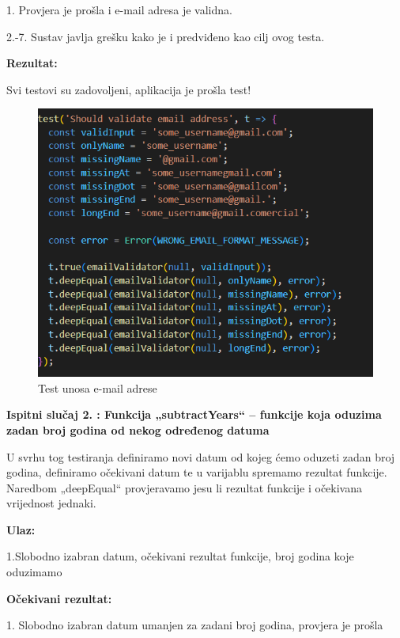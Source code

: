                 1. Provjera je prošla i e-mail adresa je validna.

                2.-7. Sustav javlja grešku kako je i predviđeno kao cilj ovog testa. 

                \textbf{Rezultat:} 

                Svi testovi su zadovoljeni, aplikacija je prošla test!

	\begin{figure}[H]
			\includegraphics[scale=0.5]{slike/EmailTest.PNG} %
			\centering
			\caption{Test unosa e-mail adrese}
			\label{fig:ppp}
			
		\end{figure}

 \textbf{Ispitni slučaj 2. : Funkcija „subtractYears“ – funkcije koja oduzima zadan broj godina od nekog određenog datuma}

U svrhu tog testiranja definiramo novi datum od kojeg ćemo oduzeti zadan broj godina, definiramo očekivani datum te u varijablu spremamo rezultat funkcije. Naredbom „deepEqual“ provjeravamo jesu li rezultat funkcije i očekivana vrijednost jednaki. 

\textbf{Ulaz:}

	1.Slobodno izabran datum, očekivani rezultat funkcije, broj godina koje oduzimamo

 \textbf{Očekivani rezultat:} 

	1. Slobodno izabran datum umanjen za zadani broj godina, provjera je prošla

